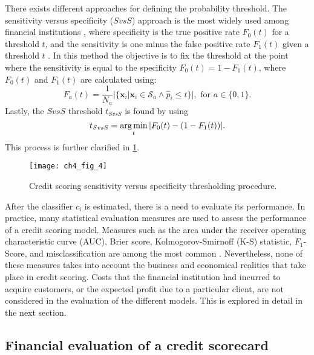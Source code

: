   There exists different approaches for defining the probability threshold. The sensitivity versus 
  specificity ($SvsS$) approach is the most widely used among financial institutions 
  \citep{Anderson2007}, where specificity is the true positive rate $F_0(t)$ for a threshold $t$, 
  and the sensitivity is one minus the false positive rate $F_1(t)$ given a threshold $t$ 
  \citep{Hernandez-Orallo2012}. In this method the objective is to fix the threshold at the point 
  where the sensitivity is equal to the specificity $F_0(t)=1-F_1(t)$, where $F_0(t)$ and $F_1(t)$ 
  are calculated using:
  \begin{equation}
   F_a(t)=\frac{1}{N_a}\vert \{ \mathbf{x}_i \vert \mathbf{x}_i \in \mathcal{S}_a \wedge \hat p_i 
  \le t \}\vert, \text{ for }  a\in\{0,1\}.
  \end{equation}
  Lastly, the $SvsS$ threshold $t_{SvsS}$ is found by using
  \begin{equation}
  t_{SvsS}= \operatorname*{arg\,min}_t \vert F_0(t) - (1-F_1(t)) \vert.
  \end{equation}
  This process is further clarified in \figurename{ \ref{fig:ch4:4}}.
  
  \begin{figure}
  \centering
  \centering
  \texttt{[image: ch4\_fig\_4]}
  \caption{Credit scoring sensitivity versus specificity thresholding procedure.}
  \label{fig:ch4:4}
  \end{figure}
  
  After the classifier $c_i$ is estimated, there is a need to evaluate its performance. In 
  practice, many statistical evaluation measures are used to assess the performance of a credit 
  scoring model. Measures such as the area under the  receiver operating characteristic curve (AUC),
  Brier score, Kolmogorov-Smirnoff (K-S) statistic,  $F_1$-Score, and misclassification are among 
  the most common \citep{Beling2005}. Nevertheless, none of these measures takes into account the 
  business and economical realities that take place in credit scoring. Costs that the financial 
  institution had incurred to acquire customers, or the expected profit due to a particular client, 
  are not considered in the evaluation of the different models. This is explored in detail in the 
  next section.

  
  \subsection{Financial evaluation of a credit scorecard }
  
